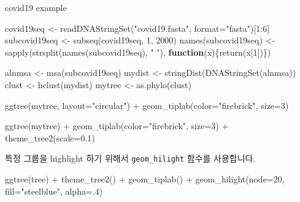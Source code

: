 \documentclass[
]{book}
\newenvironment{Shaded}{\begin{snugshade}}{\end{snugshade}}
\newcommand{\AttributeTok}[1]{\textcolor[rgb]{0.77,0.63,0.00}{#1}}
\newcommand{\ControlFlowTok}[1]{\textcolor[rgb]{0.13,0.29,0.53}{\textbf{#1}}}
\newcommand{\DecValTok}[1]{\textcolor[rgb]{0.00,0.00,0.81}{#1}}
\newcommand{\FloatTok}[1]{\textcolor[rgb]{0.00,0.00,0.81}{#1}}
\newcommand{\FunctionTok}[1]{\textcolor[rgb]{0.00,0.00,0.00}{#1}}
\newcommand{\NormalTok}[1]{#1}
\newcommand{\OtherTok}[1]{\textcolor[rgb]{0.56,0.35,0.01}{#1}}
\newcommand{\SpecialCharTok}[1]{\textcolor[rgb]{0.00,0.00,0.00}{#1}}
\newcommand{\StringTok}[1]{\textcolor[rgb]{0.31,0.60,0.02}{#1}}
\begin{document}
covid19 example

\begin{Shaded}
\begin{Highlighting}[]

\NormalTok{covid19seq }\OtherTok{\textless{}{-}} \FunctionTok{readDNAStringSet}\NormalTok{(}\StringTok{"covid19.fasta"}\NormalTok{, }\AttributeTok{format=}\StringTok{"fasta"}\NormalTok{)[}\DecValTok{1}\SpecialCharTok{:}\DecValTok{6}\NormalTok{]}
\NormalTok{subcovid19seq }\OtherTok{\textless{}{-}} \FunctionTok{subseq}\NormalTok{(covid19seq, }\DecValTok{1}\NormalTok{, }\DecValTok{2000}\NormalTok{)}
\FunctionTok{names}\NormalTok{(subcovid19seq)  }\OtherTok{\textless{}{-}} \FunctionTok{sapply}\NormalTok{(}\FunctionTok{strsplit}\NormalTok{(}\FunctionTok{names}\NormalTok{(subcovid19seq), }\StringTok{" "}\NormalTok{), }\ControlFlowTok{function}\NormalTok{(x)\{}\FunctionTok{return}\NormalTok{(x[}\DecValTok{1}\NormalTok{])\})}
  
\NormalTok{alnmsa }\OtherTok{\textless{}{-}} \FunctionTok{msa}\NormalTok{(subcovid19seq)}
\NormalTok{mydist }\OtherTok{\textless{}{-}} \FunctionTok{stringDist}\NormalTok{(}\FunctionTok{DNAStringSet}\NormalTok{(alnmsa))}
\NormalTok{clust }\OtherTok{\textless{}{-}} \FunctionTok{hclust}\NormalTok{(mydist)}
\NormalTok{mytree }\OtherTok{\textless{}{-}} \FunctionTok{as.phylo}\NormalTok{(clust)}

\FunctionTok{ggtree}\NormalTok{(mytree, }\AttributeTok{layout=}\StringTok{"circular"}\NormalTok{) }\SpecialCharTok{+}
  \FunctionTok{geom\_tiplab}\NormalTok{(}\AttributeTok{color=}\StringTok{"firebrick"}\NormalTok{, }\AttributeTok{size=}\DecValTok{3}\NormalTok{)}

\FunctionTok{ggtree}\NormalTok{(mytree) }\SpecialCharTok{+}
  \FunctionTok{geom\_tiplab}\NormalTok{(}\AttributeTok{color=}\StringTok{"firebrick"}\NormalTok{, }\AttributeTok{size=}\DecValTok{3}\NormalTok{) }\SpecialCharTok{+}
  \FunctionTok{theme\_tree2}\NormalTok{(}\AttributeTok{scale=}\FloatTok{0.1}\NormalTok{) }
\end{Highlighting}
\end{Shaded}

특정 그룹을 highlight 하기 위해서 \texttt{geom\_hilight} 함수를 사용합니다.

\begin{Shaded}
\begin{Highlighting}[]

\FunctionTok{ggtree}\NormalTok{(tree) }\SpecialCharTok{+}
  \FunctionTok{theme\_tree2}\NormalTok{() }\SpecialCharTok{+}
  \FunctionTok{geom\_tiplab}\NormalTok{() }\SpecialCharTok{+}
  \FunctionTok{geom\_hilight}\NormalTok{(}\AttributeTok{node=}\DecValTok{20}\NormalTok{, }\AttributeTok{fill=}\StringTok{"steelblue"}\NormalTok{, }\AttributeTok{alpha=}\NormalTok{.}\DecValTok{4}\NormalTok{) }
\end{Highlighting}
\end{Shaded}
\end{document}
